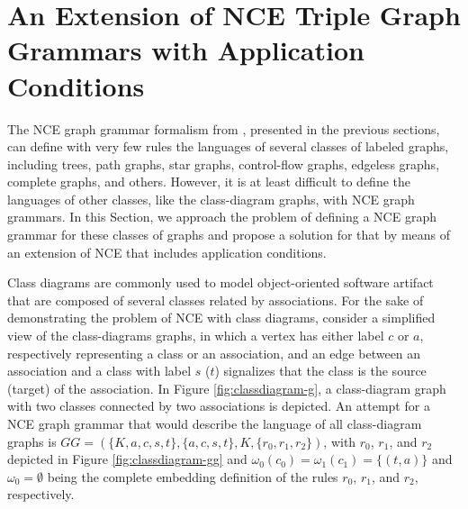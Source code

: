 \documentclass[]{report}
\begin{document}


\section{An Extension of NCE Triple Graph Grammars with Application Conditions}
The NCE graph grammar formalism from \cite{janssens1982graph}, presented in the previous sections, can define with very few rules the languages of several classes of labeled graphs, including trees, path graphs, star graphs, control-flow graphs, edgeless graphs, complete graphs, and others. However, it is at least difficult to define the languages of other classes, like the class-diagram graphs, with NCE graph grammars. In this Section, we approach the problem of defining a NCE graph grammar for these classes of graphs and propose a solution for that by means of an extension of NCE that includes application conditions.

Class diagrams are commonly used to model object-oriented software artifact that are composed of several classes related by associations. For the sake of demonstrating the problem of NCE with class diagrams, consider a simplified view of the class-diagrams graphs, in which a vertex has either label $c$ or $a$, respectively representing a class or an association, and an edge between an association and a class with label $s$ ($t$) signalizes that the class is the source (target) of the association. In Figure \ref{fig:classdiagram-g}, a class-diagram graph with two classes connected by two associations is depicted. An attempt for a NCE graph grammar that would describe the language of all class-diagram graphs is $GG = (\{K,a,c,s,t\}, \{a,c,s,t\}, K, \{r_0, r_1, r_2\})$, with $r_0$, $r_1$, and $r_2$ depicted in Figure \ref{fig:classdiagram-gg} and $\omega_0(c_0) = \omega_1(c_1) = \{(t,a)\}$ and $\omega_0 = \emptyset$ being the complete embedding definition of the rules $r_0$, $r_1$, and $r_2$, respectively.
\end{document}
